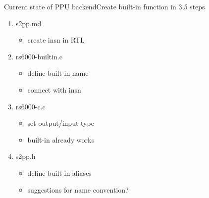 \documentclass[10pt]{beamer}
\begin{document}
\begin{frame}{Current state of PPU backend}{Create built-in function in 3,5 steps}
	\begin{enumerate}
		\item s2pp.md
		\begin{itemize}
			\item create insn in RTL
		\end{itemize}
		\item rs6000-builtin.c
		\begin{itemize}
			\item define built-in name
			\item connect with insn
		\end{itemize}
		\item rs6000-c.c
		\begin{itemize}
			\item set output/input type
			\item built-in already works
		\end{itemize}
		\item s2pp.h
		\begin{itemize}
			\item define built-in aliases
			\item suggestions for name convention?
		\end{itemize}
	\end{enumerate}
\end{frame}
\end{document}
